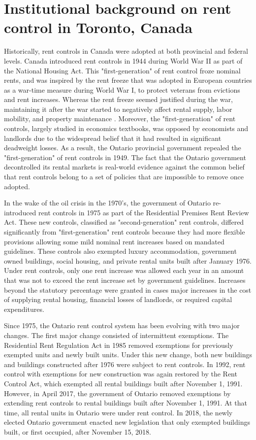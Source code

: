 \documentclass[parskip=full]{article}
\begin{document}
\section{Institutional background on rent control in Toronto, Canada}\label{sec:insitutional_background}
Historically, rent controls in Canada were adopted at both provincial and federal levels. Canada introduced rent controls in 1944 during World War II as part of the National Housing Act. This "first-generation" of rent control froze nominal rents, and was inspired by the rent freeze that was adopted in European countries as a war-time measure during World War I, to protect veterans from evictions and rent increases. Whereas the rent freeze seemed justified during the war, maintaining it after the war started to negatively affect rental supply, labor mobility, and property maintenance \citep{arnott-1995}. Moreover, the "first-generation" of rent controls, largely studied in economics textbooks, was opposed by economists and landlords due to the widespread belief that it had resulted in significant deadweight losses. As a result, the Ontario provincial government repealed the "first-generation" of rent controls in 1949. The fact that the Ontario government decontrolled its rental markets is real-world evidence against the common belief that rent controls belong to a set of policies that are impossible to remove once adopted. 

In the wake of the oil crisis in the 1970's, the government of Ontario re-introduced rent controls in 1975 as part of the Residential Premises Rent Review Act. These new controls, classified as "second-generation" rent controls, differed significantly from "first-generation" rent controls because they had more flexible provisions allowing some mild nominal rent increases based on mandated guidelines. These controls also exempted luxury accommodation, government owned buildings, social housing, and private rental units built after January 1976. Under rent controls, only one rent increase was allowed each year in an amount that was not to exceed the rent increase set by government guidelines. Increases beyond the statutory percentage were granted in cases major increases in the cost of supplying rental housing, financial losses of landlords, or required capital expenditures. 

Since 1975, the Ontario rent control system has been evolving with two major changes. The first major change consisted of intermittent exemptions. The Residential Rent Regulation Act in 1985 removed exemptions for previously exempted units and newly built units. Under this new change, both new buildings and buildings constructed after 1976 were subject to rent controls. In 1992, rent control with exemptions for new construction was again restored by the Rent Control Act, which exempted all rental buildings built after November 1, 1991. However, in April 2017, the government of Ontario removed exemptions by extending rent controls to rental buildings built after November 1, 1991. At that time, all rental units in Ontario were under rent control. In 2018, the newly elected Ontario government enacted new legislation that only exempted buildings built, or first occupied, after November 15, 2018.
\end{document}
